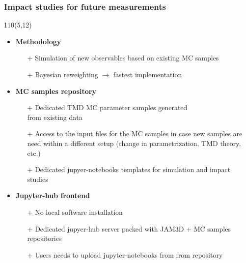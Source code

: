 \begin{frame}
\frametitle{\textbf{Impact studies for future measurements}}
\begin{textblock}{110}(5,12) 
\begin{itemize}
\item \textbf{Methodology}

  \begin{itemize}
  \item[+] Simulation of new observables based on existing MC 
           samples
  \item[+] Bayesian reweighting $\to$ fastest implementation 
  \end{itemize}
  
\item \textbf{MC samples repository }

  \begin{itemize}
  \item[+] Dedicated TMD MC parameter samples generated \\ from existing 
           data
  \item[+] Access to the input files for the MC samples in case 
           new samples are need within a different setup 
          (change in parametrization, TMD theory, etc.)
  \item[+] Dedicated jupyer-notebooks templates for simulation
           and impact studies 
  \end{itemize}

\item \textbf{Jupyter-hub frontend}

  \begin{itemize}
  \item[+] No local software installation
  \item[+] Dedicated jupyer-hub server packed with JAM3D + 
           MC samples repositories 
  \item[+] Users needs to upload jupyter-notebooks from 
           from repository  
  \end{itemize}

\end{itemize}
\end{textblock}
\end{frame}



